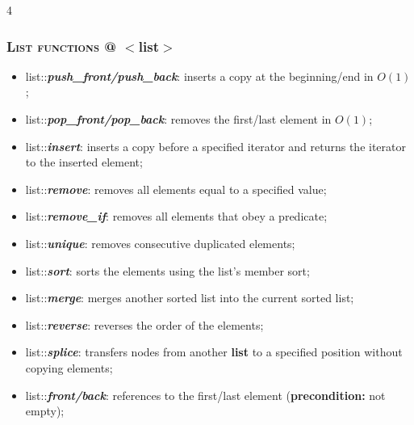 \documentclass[10pt]{article}
\begin{document}
\begin{multicols*}{4}
{\subsubsection*{\textsc{List functions} @ $<$list$>$} 
\begin{itemize}[leftmargin=*,topsep=0.25pt]
  \setlength\itemsep{-1.8pt}
  \item list::\emph{\textbf{push\_front/push\_back}}: inserts a copy at the beginning/end in $O(1)$;
  \item list::\emph{\textbf{pop\_front/pop\_back}}: removes the first/last element in $O(1)$;
  \item list::\emph{\textbf{insert}}: inserts a copy before a specified iterator and returns the iterator to the inserted element;
  \item list::\emph{\textbf{remove}}: removes all elements equal to a specified value;
  \item list::\emph{\textbf{remove\_if}}: removes all elements that obey a predicate;
  \item list::\emph{\textbf{unique}}: removes consecutive duplicated elements;
  \item list::\emph{\textbf{sort}}: sorts the elements using the list's member sort;
  \item list::\emph{\textbf{merge}}: merges another sorted list into the current sorted list;
  \item list::\emph{\textbf{reverse}}: reverses the order of the elements;
  \item list::\emph{\textbf{splice}}: transfers nodes from another \textbf{list} to a specified position without copying elements;
  \item list::\emph{\textbf{front/back}}: references to the first/last element (\textbf{precondition:} not empty);
\end{itemize}


}
\end{multicols*}
\end{document}
